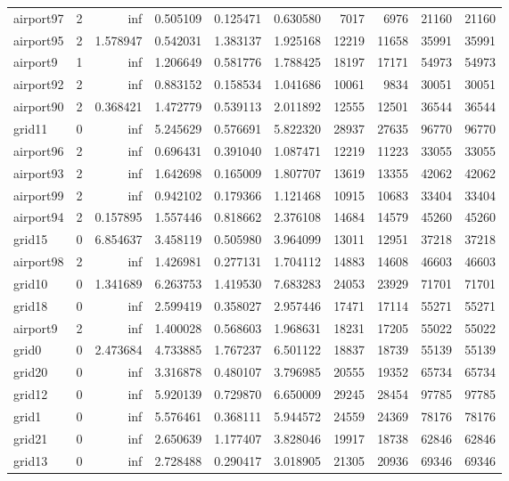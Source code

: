 \begin{longtable}{|l|r|r|r|r|r|r|r|r|r|}
airport97 & 2 & inf & 0.505109 & 0.125471 & 0.630580 & 7017 & 6976 & 21160 & 21160 \\
airport95 & 2 & 1.578947 & 0.542031 & 1.383137 & 1.925168 & 12219 & 11658 & 35991 & 35991 \\
airport9 & 1 & inf & 1.206649 & 0.581776 & 1.788425 & 18197 & 17171 & 54973 & 54973 \\
airport92 & 2 & inf & 0.883152 & 0.158534 & 1.041686 & 10061 & 9834 & 30051 & 30051 \\
airport90 & 2 & 0.368421 & 1.472779 & 0.539113 & 2.011892 & 12555 & 12501 & 36544 & 36544 \\
grid11 & 0 & inf & 5.245629 & 0.576691 & 5.822320 & 28937 & 27635 & 96770 & 96770 \\
airport96 & 2 & inf & 0.696431 & 0.391040 & 1.087471 & 12219 & 11223 & 33055 & 33055 \\
airport93 & 2 & inf & 1.642698 & 0.165009 & 1.807707 & 13619 & 13355 & 42062 & 42062 \\
airport99 & 2 & inf & 0.942102 & 0.179366 & 1.121468 & 10915 & 10683 & 33404 & 33404 \\
airport94 & 2 & 0.157895 & 1.557446 & 0.818662 & 2.376108 & 14684 & 14579 & 45260 & 45260 \\
grid15 & 0 & 6.854637 & 3.458119 & 0.505980 & 3.964099 & 13011 & 12951 & 37218 & 37218 \\
airport98 & 2 & inf & 1.426981 & 0.277131 & 1.704112 & 14883 & 14608 & 46603 & 46603 \\
grid10 & 0 & 1.341689 & 6.263753 & 1.419530 & 7.683283 & 24053 & 23929 & 71701 & 71701 \\
grid18 & 0 & inf & 2.599419 & 0.358027 & 2.957446 & 17471 & 17114 & 55271 & 55271 \\
airport9 & 2 & inf & 1.400028 & 0.568603 & 1.968631 & 18231 & 17205 & 55022 & 55022 \\
grid0 & 0 & 2.473684 & 4.733885 & 1.767237 & 6.501122 & 18837 & 18739 & 55139 & 55139 \\
grid20 & 0 & inf & 3.316878 & 0.480107 & 3.796985 & 20555 & 19352 & 65734 & 65734 \\
grid12 & 0 & inf & 5.920139 & 0.729870 & 6.650009 & 29245 & 28454 & 97785 & 97785 \\
grid1 & 0 & inf & 5.576461 & 0.368111 & 5.944572 & 24559 & 24369 & 78176 & 78176 \\
grid21 & 0 & inf & 2.650639 & 1.177407 & 3.828046 & 19917 & 18738 & 62846 & 62846 \\
grid13 & 0 & inf & 2.728488 & 0.290417 & 3.018905 & 21305 & 20936 & 69346 & 69346 \\

\end{longtable}
